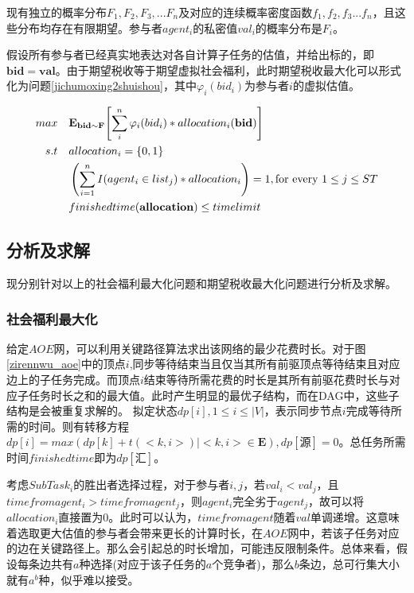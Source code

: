 \documentclass[promaster]{thesis-uestc}
\begin{document}
现有独立的概率分布$F_1,F_2,F_3,...F_n$及对应的连续概率密度函数$f_1,f_2,f_3...f_n$，且这些分布均存在有限期望。参与者$agent_i$的私密值$val_i$的概率分布是$F_i$。

假设所有参与者已经真实地表达对各自计算子任务的估值，并给出标的，即$\mathbf{bid}=\mathbf{val}$。由于期望税收等于期望虚拟社会福利，此时期望税收最大化可以形式化为问题\ref{jichumoxing2shuishou}，其中$\varphi _i(bid_i)$为参与者$i$的虚拟估值。

\begin{align}
    \label{jichumoxing2shuishou} 
    max\quad&\mathbf{E}_{\mathbf{bid}\sim\mathbf{F}}{\left[\sum_{i}^{n}{\varphi _i(bid_i)*allocation_i(\mathbf{bid})}\right]}\\
    s.t                     \quad&allocation_i = \{0,1\}\notag\\
    \quad&\left(\sum_{i=1}^{n}{I(agent_i \in list_j)*allocation_i}\right) = 1,\text{for every }1 \leq j \leq ST\notag\\
    \quad&finishedtime(\mathbf{allocation}) \leq timelimit
    \notag
\end{align}

\FloatBarrier

\subsection{分析及求解}
现分别针对以上的社会福利最大化问题和期望税收最大化问题进行分析及求解。
\subsubsection{社会福利最大化}

给定$AOE$网，可以利用关键路径算法求出该网络的最少花费时长。对于图\ref{zirennwu_aoe}中的顶点$i$,同步等待结束当且仅当其所有前驱顶点等待结束且对应边上的子任务完成。而顶点$i$结束等待所需花费的时长是其所有前驱花费时长与对应子任务时长之和的最大值。此时产生明显的最优子结构，而在DAG中，这些子结构是会被重复求解的。
拟定状态$dp[i],1 \leq i\leq |V|$，表示同步节点$i$完成等待所需的时间。则有转移方程$dp[i] = max(dp[k]+t(<k,i>)|<k,i> \in \mathbf{E}),dp[\text{源}] = 0$。总任务所需时间$finishedtime$即为$dp[\text{汇}]$。


考虑$SubTask_i$的胜出者选择过程，对于参与者$i,j$，若$val_i < val_j$，且$timefromagent_i > timefromagent_j$，则$agent_i$完全劣于$agent_j$，故可以将$allocation_i$直接置为0。此时可以认为，$timefromagent$随着$val$单调递增。这意味着选取更大估值的参与者会带来更长的计算时长，在$AOE$网中，若该子任务对应的边在关键路径上。那么会引起总的时长增加，可能违反限制条件。总体来看，假设每条边共有$a$种选择(对应于该子任务的$a$个竞争者)，那么$b$条边，总可行集大小就有$a^b$种，似乎难以接受。
\end{document}
